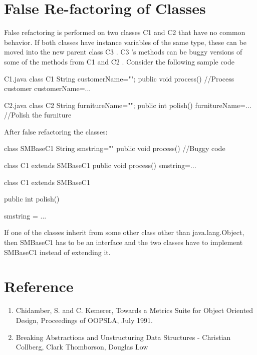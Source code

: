 \section{False Re-factoring of Classes}
False refactoring is performed on two classes C1 and C2 that have no common behavior. If both classes have instance variables of the same type, these can be moved into the new parent class C3 . C3 's methods can be buggy versions of some of the methods from C1 and C2 .
Consider the following sample code
\begin{listing}{1}
C1.java
class C1 {
        String customerName="";
        public void process() {
         //Process customer
         customerName=...
        }
 }

C2.java
class C2 {
        String furnitureName="";
        public int polish(){
         furnitureName=...
         //Polish the furniture
        }
 }
\end{listing}
After false refactoring the classes:
\begin{listing}{1}
class SMBaseC1 {
        String smstring=""
        public void process() {
          //Buggy code
        }
}

class C1 extends SMBaseC1 {
        public void process() {
          smstring=...
        }
}

class C1 extends SMBaseC1 {
        public int  polish() {
         smstring = ...

        }
}
\end{listing}

If one of the classes inherit from some other class other than java.lang.Object, then SMBaseC1 has to be an interface and the two classes have to implement SMBaseC1 instead of extending it.


\section{Reference}
\begin{enumerate}
\item  Chidamber, S. and C. Kemerer, Towards a Metrics Suite for Object Oriented Design, Proceedings of OOPSLA, July 1991.
\item Breaking
Abstractions and Unstructuring Data Structures - Christian Collberg, Clark Thomborson, Douglas Low
\end{enumerate}












